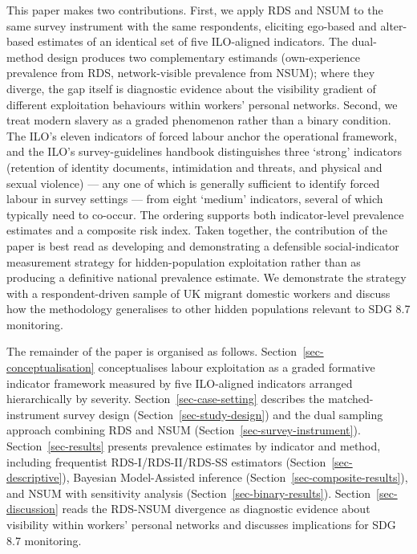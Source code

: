 \documentclass[
  12pt,
  letterpaper,
  DIV=11,
  numbers=noendperiod]{scrartcl}
\begin{document}
This paper makes two contributions. First, we apply RDS and NSUM to the
same survey instrument with the same respondents, eliciting ego-based
and alter-based estimates of an identical set of five ILO-aligned
indicators. The dual-method design produces two complementary estimands
(own-experience prevalence from RDS, network-visible prevalence from
NSUM); where they diverge, the gap itself is diagnostic evidence about
the visibility gradient of different exploitation behaviours within
workers' personal networks. Second, we treat modern slavery as a graded
phenomenon rather than a binary condition. The ILO's eleven indicators
of forced labour \autocite{ILO11-indicators,int25-ilo} anchor the
operational framework, and the ILO's survey-guidelines handbook
\autocite{hard24-ilo} distinguishes three `strong' indicators (retention
of identity documents, intimidation and threats, and physical and sexual
violence) --- any one of which is generally sufficient to identify
forced labour in survey settings --- from eight `medium' indicators,
several of which typically need to co-occur. The ordering supports both
indicator-level prevalence estimates and a composite risk index. Taken
together, the contribution of the paper is best read as developing and
demonstrating a defensible social-indicator measurement strategy for
hidden-population exploitation rather than as producing a definitive
national prevalence estimate. We demonstrate the strategy with a
respondent-driven sample of UK migrant domestic workers and discuss how
the methodology generalises to other hidden populations relevant to SDG
8.7 monitoring.

The remainder of the paper is organised as follows.
Section~\ref{sec-conceptualisation} conceptualises labour exploitation
as a graded formative indicator framework measured by five ILO-aligned
indicators arranged hierarchically by severity.
Section~\ref{sec-case-setting} describes the matched-instrument survey
design (Section~\ref{sec-study-design}) and the dual sampling approach
combining RDS and NSUM (Section~\ref{sec-survey-instrument}).
Section~\ref{sec-results} presents prevalence estimates by indicator and
method, including frequentist RDS-I/RDS-II/RDS-SS estimators
(Section~\ref{sec-descriptive}), Bayesian Model-Assisted inference
(Section~\ref{sec-composite-results}), and NSUM with sensitivity
analysis (Section~\ref{sec-binary-results}).
Section~\ref{sec-discussion} reads the RDS-NSUM divergence as diagnostic
evidence about visibility within workers' personal networks and
discusses implications for SDG 8.7 monitoring.
\end{document}
